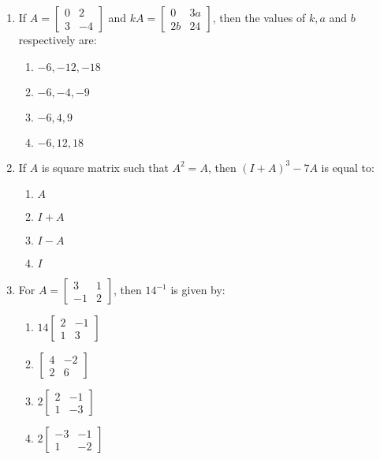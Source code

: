 \documentclass{article}
\newcommand{\myvec}[1]{\begin{bmatrix}#1\end{bmatrix}}
\begin{document}
\begin{enumerate}
    \item If $A =\myvec{0&2\\3&-4}$ and $kA =\myvec{0&3a\\2b&24}$, then the values of $k ,a$ and $b$ respectively are:
    \begin{enumerate}
        \item $-6, -12, -18$
        \item $-6, -4, -9$
        \item $-6, 4, 9$
        \item $-6, 12, 18$
    \end{enumerate}
    
    \item If $A$ is square matrix such that $A^2 = A$, then $(I + A)^3 - 7A$ is equal to:
    \begin{enumerate}
        \item $A$
        \item $I + A$
        \item $I - A$
        \item $I$ 
    \end{enumerate}
    
    \item For $A =
        \myvec{3 & 1 \\ -1 & 2}$, then $14^{-1}$ is given by:
    \begin{enumerate}
        \item $14 \myvec{2 & -1 \\ 1 & 3}$
        \item $\myvec{4 & -2 \\ 2 & 6}$
        \item $2\myvec{2 & -1 \\ 1 & -3}$
        \item $2\myvec{-3 & -1 \\ 1 & -2 }$
    \end{enumerate}
    

\end{enumerate}
\end{document}
